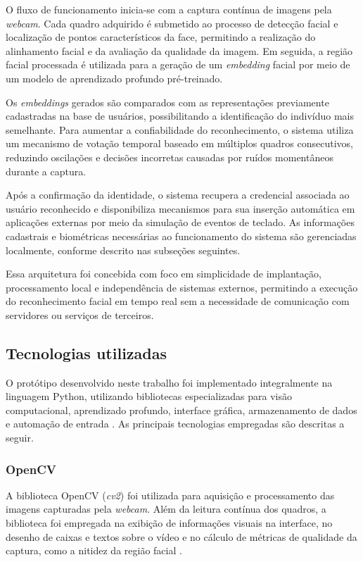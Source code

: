 O fluxo de funcionamento inicia-se com a captura contínua de imagens pela \textit{webcam}. Cada quadro adquirido é submetido ao processo de detecção facial e localização de pontos característicos da face, permitindo a realização do alinhamento facial e da avaliação da qualidade da imagem. Em seguida, a região facial processada é utilizada para a geração de um \textit{embedding} facial por meio de um modelo de aprendizado profundo pré-treinado.

Os \textit{embeddings} gerados são comparados com as representações previamente cadastradas na base de usuários, possibilitando a identificação do indivíduo mais semelhante. Para aumentar a confiabilidade do reconhecimento, o sistema utiliza um mecanismo de votação temporal baseado em múltiplos quadros consecutivos, reduzindo oscilações e decisões incorretas causadas por ruídos momentâneos durante a captura.

Após a confirmação da identidade, o sistema recupera a credencial associada ao usuário reconhecido e disponibiliza mecanismos para sua inserção automática em aplicações externas por meio da simulação de eventos de teclado. As informações cadastrais e biométricas necessárias ao funcionamento do sistema são gerenciadas localmente, conforme descrito nas subseções seguintes.

Essa arquitetura foi concebida com foco em simplicidade de implantação, processamento local e independência de sistemas externos, permitindo a execução do reconhecimento facial em tempo real sem a necessidade de comunicação com servidores ou serviços de terceiros.

\subsection{Tecnologias utilizadas}

O protótipo desenvolvido neste trabalho foi implementado integralmente na linguagem Python, utilizando bibliotecas especializadas para visão computacional, aprendizado profundo, interface gráfica, armazenamento de dados e automação de entrada \cite{python_docs}. As principais tecnologias empregadas são descritas a seguir.

\subsubsection{OpenCV}

A biblioteca OpenCV (\textit{cv2}) foi utilizada para aquisição e processamento das imagens capturadas pela \textit{webcam}. Além da leitura contínua dos quadros, a biblioteca foi empregada na exibição de informações visuais na interface, no desenho de caixas e textos sobre o vídeo e no cálculo de métricas de qualidade da captura, como a nitidez da região facial \cite{opencv_python_docs}.

